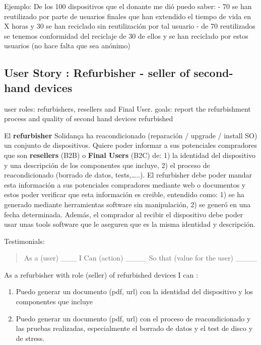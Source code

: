 \documentclass[
]{book}
\begin{document}
Ejemplo: De los 100 dispositivos que el donante me dió puedo saber:
- 70 se han reutilizado por parte de usuarios finales que han extendido el tiempo de vida en X horas y 30 se han reciclado sin reutilización por tal usuario
- de 70 reutilizados se tenemos conformidad del reciclaje de 30 de ellos y se han reciclado por estos usuarios (no hace falta que sea anónimo)

\hypertarget{user-story-refurbisher---seller-of-second-hand-devices}{%
\subsection{User Story : Refurbisher - seller of second-hand devices}\label{user-story-refurbisher---seller-of-second-hand-devices}}

user roles: refurbishers, resellers and Final User.
goals: report the refurbishment process and quality of second hand devices refurbished

El \textbf{refurbisher} Solidança ha reacondicionado (reparación / upgrade / install SO) un conjunto de dispositivos. Quiere poder informar a sus potenciales compradores que son \textbf{resellers} (B2B) o \textbf{Final Users} (B2C) de: 1) la identidad del dispositivo y una descripción de los componentes que incluye, 2) el proceso de reacondicionado (borrado de datos, tests,\ldots..). El refurbisher debe poder mandar esta información a sus potenciales compradores mediante web o documentos y estos poder verificar que esta información es creible, entendido como: 1) se ha generado mediante herramientas software sin manipulación, 2) se generó en una fecha determinada. Además, el comprador al recibir el dispositivo debe poder usar unas tools software que le aseguren que es la misma identidad y descripción.

Testimonials:

\begin{quote}
As a (user) \_\_\_ I Can (action) \_\_\_\_ So that (value for the user) \_\_\_\_
\end{quote}

As a refurbisher with role (seller) of refurbished devices I can :

\begin{enumerate}
\def\labelenumi{\arabic{enumi}.}
\item
  Puedo generar un documento (pdf, url) con la identidad del dispositivo y los componentes que incluye
\item
  Puedo generar un documento (pdf, url) con el proceso de reacondicionado y las pruebas realizadas, especialmente el borrado de datos y el test de disco y de stress.
\end{enumerate}
\end{document}
